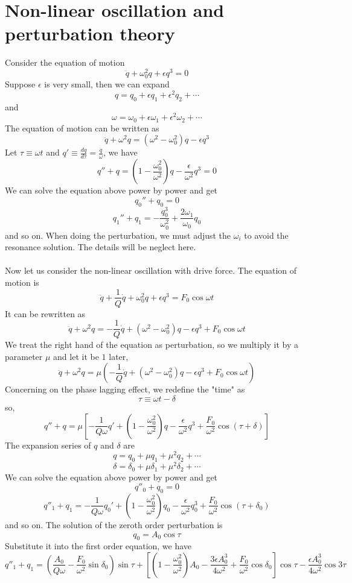 \documentclass[cyan]{elegantnote}
\begin{document}
\section{Non-linear oscillation and perturbation theory}
Consider the equation of motion
\[\ddot{q} + \omega_0^2 q + \epsilon q^3 = 0\]
Suppose $\epsilon$ is very small, then we can expand
\[q = q_0 + \epsilon q_1 + \epsilon^2 q_2 + \cdots\]
and
\[\omega = \omega_0 + \epsilon \omega_1 + \epsilon^2 \omega_2 + \cdots\]
The equation of motion can be written as
\[\ddot{q} + \omega^2 q = (\omega^2 -\omega_0^2)q - \epsilon q^3\]
Let $\tau \equiv \omega t$ and $q' \equiv \frac{dq}{d\tau} = \frac{\dot{q}}{\omega}$, we have
\[q'' + q = (1- \frac{\omega_0^2}{\omega^2})q - \frac{\epsilon}{\omega^2} q^3 = 0\]
We can solve the equation above power by power and get
\[q_0'' + q_0 = 0\]
\[q_1'' + q_1 = -\frac{q_0^3}{\omega_0^2} + \frac{2\omega_1}{\omega_0}q_0\]
and so on. When doing the perturbation, we must adjust the $\omega_i$ to avoid the resonance solution. The details will be neglect here.\\ \\
Now let us consider the non-linear oscillation with drive force. The equation of motion is
\[\ddot{q} + \frac{1}{Q}\dot{q} + \omega_0^2 q + \epsilon q^3 = F_0 \cos \omega t\]
It can be rewritten as
\[\ddot{q} + \omega^2 q = - \frac{1}{Q} \dot{q} + (\omega^2 - \omega_0^2)q - \epsilon q^3 + F_0\cos\omega t\]
We treat the right hand of the equation as perturbation, so we multiply it by a parameter $\mu$ and let it be $1$ later,
\[\ddot{q} + \omega^2 q = \mu \left (- \frac{1}{Q} \dot{q} + (\omega^2 - \omega_0^2)q - \epsilon q^3 + F_0\cos\omega t \right )\]
Concerning on the phase lagging effect, we redefine the "time" as 
\[\tau \equiv \omega t - \delta\]
so,
\[q'' + q = \mu \left [ -\frac{1}{Q\omega} q' + \left ( 1- \frac{\omega_0^2}{\omega^2} \right ) q - \frac{\epsilon}{\omega^2} q^3 + \frac{F_0}{\omega^2} \cos (\tau + \delta) \right ]\]
The expansion series of $q$ and $\delta$ are
\[q = q_0 + \mu q_1 + \mu^2 q_2 + \cdots\]
\[\delta = \delta_0 + \mu \delta_1 + \mu^2 \delta_2 + \cdots\]
We can solve the equation above power by power and get
\[q''_0 + q_0 = 0\]
\[q''_1 + q_1 =  -\frac{1}{Q\omega} q_0' + \left ( 1- \frac{\omega_0^2}{\omega^2} \right ) q_0 - \frac{\epsilon}{\omega^2} q_0^3 + \frac{F_0}{\omega^2} \cos (\tau + \delta_0)\]
and so on. The solution of the zeroth order perturbation is
\[q_0 = A_0 \cos\tau\]
Substitute it into the first order equation, we have
\[q''_1 + q_1 = \left ( \frac{A_0}{Q\omega} - \frac{F_0}{\omega^2} \sin\delta_0 \right ) \sin\tau + \left [ \left ( 1 - \frac{\omega_0^2}{\omega^2}\right ) A_0 - \frac{3\epsilon A_0^3}{4\omega^2} + \frac{F_0}{\omega^2}\cos\delta_0 \right ] \cos\tau - \frac{\epsilon A_0^3}{4\omega^2} \cos 3\tau\]
\end{document}
